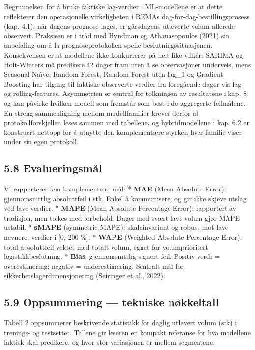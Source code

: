 \documentclass[
  norsk,
  11pt,
  a4paper,
]{article}
\begin{document}
Begrunnelsen for å bruke faktiske lag-verdier i ML-modellene er at dette
reflekterer den operasjonelle virkeligheten i REMAs
dag-for-dag-bestillingsprosess (kap. 4.1): når dagens prognose lages, er
gårsdagens utleverte volum allerede observert. Praksisen er i tråd med
Hyndman og Athanasopoulos (2021) sin anbefaling om å la
prognoseprotokollen speile beslutningssituasjonen. Konsekvensen er at
modellene ikke konkurrerer på helt like vilkår: SARIMA og Holt-Winters
må predikere 42 dager fram uten å se observasjoner underveis, mens
Seasonal Naïve, Random Forest, Random Forest uten lag\_1 og Gradient
Boosting har tilgang til faktiske observerte verdier fra foregående
dager via lag- og rolling-features. Asymmetrien er sentral for
tolkningen av resultatene i kap. 8 og kan påvirke hvilken modell som
fremstår som best i de aggregerte feilmålene. En streng sammenligning
mellom modellfamilier krever derfor at protokollforskjellen leses sammen
med tabellene, og hybridmodellene i kap. 6.2 er konstruert nettopp for å
utnytte den komplementære styrken hver familie viser under sin egen
protokoll.

\subsection{5.8 Evalueringsmål}\label{evalueringsmuxe5l}

Vi rapporterer fem komplementære mål: * \textbf{MAE} (Mean Absolute
Error): gjennomsnittlig absoluttfeil i stk. Enkel å kommunisere, og gir
ikke skjeve utslag ved lave verdier. * \textbf{MAPE} (Mean Absolute
Percentage Error): rapportert av tradisjon, men tolkes med forbehold.
Dager med svært lavt volum gjør MAPE ustabil. * \textbf{sMAPE}
(symmetric MAPE): skalainvariant og robust mot lave nevnere, verdier i
{[}0, 200 \%{]}. * \textbf{WAPE} (Weighted Absolute Percentage Error):
total absoluttfeil vektet med totalt volum, egnet for volumprioritert
logistikkbeslutning. * \textbf{Bias}: gjennomsnittlig signert feil.
Positiv verdi = overestimering; negativ = underestimering. Sentralt mål
for sikkerhetslagerdimensjonering (Seiringer et al., 2022).

\subsection{5.9 Oppsummering --- tekniske
nøkkeltall}\label{oppsummering-tekniske-nuxf8kkeltall}

Tabell 2 oppsummerer beskrivende statistikk for daglig utlevert volum
(stk) i trenings- og testsettet. Tallene gir leseren en kompakt
referanse for hva modellene faktisk skal predikere, og hvor stor
variasjonen er mellom segmentene.
\end{document}
